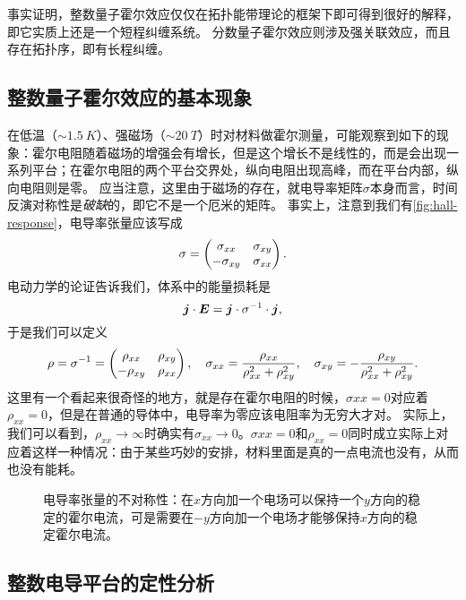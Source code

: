 事实证明，整数量子霍尔效应仅仅在拓扑能带理论的框架下即可得到很好的解释，即它实质上还是一个短程纠缠系统。
分数量子霍尔效应则涉及强关联效应，而且存在拓扑序，即有长程纠缠。

\subsection{整数量子霍尔效应的基本现象}


在低温（$\sim \SI{1.5}{K}$）、强磁场（$\sim \SI{20}{T}$）时对材料做霍尔测量，可能观察到如下的现象：霍尔电阻随着磁场的增强会有增长，但是这个增长不是线性的，而是会出现一系列平台；在霍尔电阻的两个平台交界处，纵向电阻出现高峰，而在平台内部，纵向电阻则是零。
应当注意，这里由于磁场的存在，就电导率矩阵$\sigma$本身而言，时间反演对称性是\emph{破缺}的，即它不是一个厄米的矩阵。
事实上，注意到我们有\autoref{fig:hall-response}，电导率张量应该写成
\begin{equation}
    \sigma = \pmqty{\sigma_{xx} & \sigma_{xy} \\ - \sigma_{xy} & \sigma_{xx}}.
\end{equation}
电动力学的论证告诉我们，体系中的能量损耗是
\[
    \vb*{j} \cdot \vb*{E} = \vb*{j} \cdot \sigma^{-1} \cdot \vb*{j},
\]
于是我们可以定义
\begin{equation}
    \rho = \sigma^{-1} = \pmqty{\rho_{xx} & \rho_{xy} \\ - \rho_{xy} & \rho_{xx}}, \quad \sigma_{xx} = \frac{\rho_{xx}}{\rho_{xx}^2 + \rho_{xy}^2}, \quad \sigma_{xy} = - \frac{\rho_{xy}}{\rho_{xx}^2 + \rho_{xy}^2}.
    \label{eq:hall-conductivity-r-relation}
\end{equation}
这里有一个看起来很奇怪的地方，就是存在霍尔电阻的时候，$\sigma{xx} = 0$对应着$\rho_{xx} = 0$，但是在普通的导体中，电导率为零应该电阻率为无穷大才对。
实际上，我们可以看到，$\rho_{xx} \to \infty$时确实有$\sigma_{xx} \to 0$。$\sigma{xx} = 0$和$\rho_{xx} = 0$同时成立实际上对应着这样一种情况：由于某些巧妙的安排，材料里面是真的一点电流也没有，从而也没有能耗。

\begin{figure}
    \centering
    
    \caption{电导率张量的不对称性：在$x$方向加一个电场可以保持一个$y$方向的稳定的霍尔电流，可是需要在$-y$方向加一个电场才能够保持$x$方向的稳定霍尔电流。}
    \label{fig:hall-response}
\end{figure}

\subsection{整数电导平台的定性分析}

